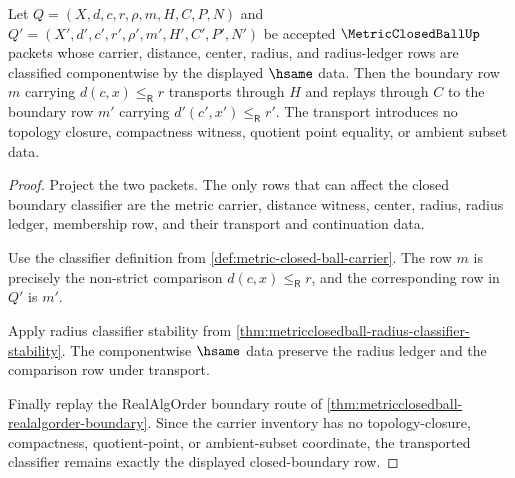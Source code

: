 \begin{theorem}
\label{thm:metricclosedball-boundary-classifier-transport}
Let $Q=(X,d,c,r,\rho,m,H,C,P,N)$ and $Q'=(X',d',c',r',\rho',m',H',C',P',N')$ be accepted $\MetricClosedBallUp$ packets whose carrier, distance, center, radius, and radius-ledger rows are classified componentwise by the displayed $\hsame$ data. Then the boundary row $m$ carrying $d(c,x)\leq_{\mathsf R}r$ transports through $H$ and replays through $C$ to the boundary row $m'$ carrying $d'(c',x')\leq_{\mathsf R}r'$. The transport introduces no topology closure, compactness witness, quotient point equality, or ambient subset data.
\end{theorem}
\begin{proof}
Project the two packets. The only rows that can affect the closed boundary classifier are the metric carrier, distance witness, center, radius, radius ledger, membership row, and their transport and continuation data.

Use the classifier definition from \autoref{def:metric-closed-ball-carrier}. The row $m$ is precisely the non-strict comparison $d(c,x)\leq_{\mathsf R}r$, and the corresponding row in $Q'$ is $m'$.

Apply radius classifier stability from \autoref{thm:metricclosedball-radius-classifier-stability}. The componentwise $\hsame$ data preserve the radius ledger and the comparison row under transport.

Finally replay the RealAlgOrder boundary route of \autoref{thm:metricclosedball-realalgorder-boundary}. Since the carrier inventory has no topology-closure, compactness, quotient-point, or ambient-subset coordinate, the transported classifier remains exactly the displayed closed-boundary row.
\end{proof}

